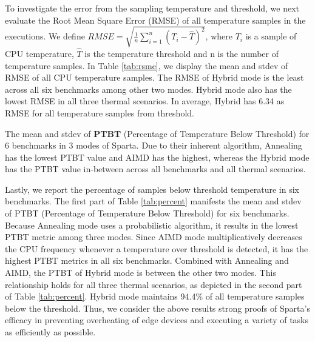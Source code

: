 To investigate the error from the sampling temperature and threshold, we next evaluate the Root Mean Square Error (RMSE) of all temperature samples in the executions. We define $RMSE = \sqrt{\frac{1}{n}\sum_{i=1}^{n}(T_i - \hat{T})^2}$, where $T_i$ is a sample of CPU temperature, $\hat{T}$ is the temperature threshold and n is the number of temperature samples. In Table \ref{tab:rsme}, we display the mean and stdev of RMSE of all CPU temperature samples. The RMSE of Hybrid mode is the least across all six benchmarks among other two modes. Hybrid mode also has the lowest RMSE in all three thermal scenarios. In average, Hybrid has 6.34 as RMSE for all temperature samples from threshold. 


\begin{table}[t]
\caption{The mean and stdev of \textbf{PTBT} (Percentage of Temperature Below Threshold) for 6 benchmarks in 3 modes of Sparta. Due to their inherent algorithm, Annealing has the lowest PTBT value and AIMD has the highest, whereas the Hybrid mode has the PTBT value in-between across all benchmarks and all thermal scenarios.}\label{tab:percent}
\vspace{1mm}
\centering
\resizebox{350pt}{!}{}
\newline
\vspace{3mm}
\newline
\resizebox{300pt}{!}{}
\end{table}


Lastly, we report the percentage of samples below threshold temperature in six benchmarks. The first part of Table \ref{tab:percent} manifests the mean and stdev of PTBT (Percentage of Temperature Below Threshold) for six benchmarks. Because Annealing mode uses a probabilistic algorithm, it results in the lowest PTBT metric among three modes. Since AIMD mode multiplicatively decreases the CPU frequency whenever a temperature over threshold is detected, it has the highest PTBT metrics in all six benchmarks. Combined with Annealing and AIMD, the PTBT of Hybrid mode is between the other two modes. This relationship holds for all three thermal scenarios, as depicted in the second part of Table \ref{tab:percent}. Hybrid mode maintains 94.4\% of all temperature samples below the threshold. Thus, we consider the above results strong proofs of Sparta's efficacy in preventing overheating of edge devices and executing a variety of tasks as efficiently as possible.





